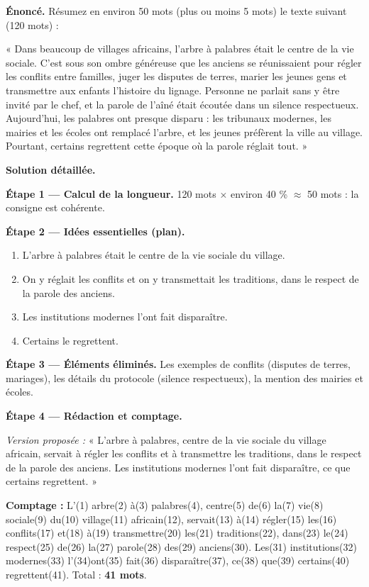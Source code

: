 \documentclass[11pt]{article}
\begin{document}
\begin{exoresolu}
\textbf{Énoncé.} Résumez en environ 50 mots (plus ou moins 5 mots) le texte suivant (120 mots) :

« Dans beaucoup de villages africains, l'arbre à palabres était le centre de la vie sociale. C'est sous son ombre généreuse que les anciens se réunissaient pour régler les conflits entre familles, juger les disputes de terres, marier les jeunes gens et transmettre aux enfants l'histoire du lignage. Personne ne parlait sans y être invité par le chef, et la parole de l'aîné était écoutée dans un silence respectueux. Aujourd'hui, les palabres ont presque disparu : les tribunaux modernes, les mairies et les écoles ont remplacé l'arbre, et les jeunes préfèrent la ville au village. Pourtant, certains regrettent cette époque où la parole réglait tout. »

\tcblower
\textbf{Solution détaillée.}

\textbf{Étape 1 — Calcul de la longueur.} 120 mots $\times$ environ 40 \% $\approx$ 50 mots : la consigne est cohérente.

\textbf{Étape 2 — Idées essentielles (plan).}
\begin{enumerate}
\item L'arbre à palabres était le centre de la vie sociale du village.
\item On y réglait les conflits et on y transmettait les traditions, dans le respect de la parole des anciens.
\item Les institutions modernes l'ont fait disparaître.
\item Certains le regrettent.
\end{enumerate}

\textbf{Étape 3 — Éléments éliminés.} Les exemples de conflits (disputes de terres, mariages), les détails du protocole (silence respectueux), la mention des mairies et écoles.

\textbf{Étape 4 — Rédaction et comptage.}

\emph{Version proposée :} « L'arbre à palabres, centre de la vie sociale du village africain, servait à régler les conflits et à transmettre les traditions, dans le respect de la parole des anciens. Les institutions modernes l'ont fait disparaître, ce que certains regrettent. »

\textbf{Comptage :} L'(1) arbre(2) à(3) palabres(4), centre(5) de(6) la(7) vie(8) sociale(9) du(10) village(11) africain(12), servait(13) à(14) régler(15) les(16) conflits(17) et(18) à(19) transmettre(20) les(21) traditions(22), dans(23) le(24) respect(25) de(26) la(27) parole(28) des(29) anciens(30). Les(31) institutions(32) modernes(33) l'(34)ont(35) fait(36) disparaître(37), ce(38) que(39) certains(40) regrettent(41). Total : \textbf{41 mots}.


\end{exoresolu}
\end{document}
